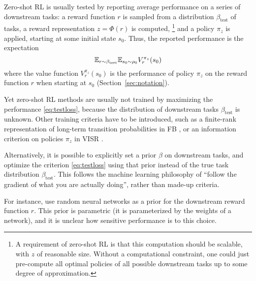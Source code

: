 \documentclass[11pt,a4paper]{article}
\newcommand{\betatest}{\beta_{\mathrm{test}}}
\begin{document}
Zero-shot RL is usually tested by reporting average performance on
a series of downstream tasks: a reward function $r$ is sampled from a
distribution $\betatest$ of tasks, a reward representation $z=\Phi(r)$ is
computed, \footnote{A requirement of zero-shot RL is that this
computation should be scalable, with $z$ of reasonable size. Without a computational constraint, one
could just pre-compute all optimal policies of all possible downstream
tasks up to some degree of approximation.
} and a policy $\pi_z$ is applied, starting at some initial state
$s_0$. Thus, the reported performance is the expectation
\begin{equation}
\label{eq:testloss}
\E_{r\sim \betatest} \E_{s_0\sim \rho_0} V^{\pi_z}_r(s_0)
\end{equation}
where the value function $V^{\pi_z}_r(s_0)$ is the performance of policy
$\pi_z$ on the reward function $r$ when starting at $s_0$
(Section~\ref{sec:notation}).

Yet zero-shot RL methods are usually not trained by maximizing the
performance \eqref{eq:testloss}, because the distribution of downstream
tasks $\betatest$ is unknown. Other training criteria have to be
introduced, such as a finite-rank representation of long-term transition
probabilities in FB \cite{allpolicies}, or an information criterion on
policies $\pi_z$ in VISR \cite{visr}.

Alternatively, it is possible to explicitly set a prior
$\beta$ on downstream tasks, and optimize the criterion \eqref{eq:testloss} using that
prior instead of the true task distribution $\betatest$. 
This follows the machine learning
philosophy of ``follow the gradient of what you are actually doing'',
rather than made-up criteria.

For instance,
\cite{frans2024unsupervised} use random neural networks as a prior for
the downstream reward function $r$. This prior is parametric (it is
parameterized by the weights of a network), and it is unclear how
sensitive performance is to this choice.
\end{document}
